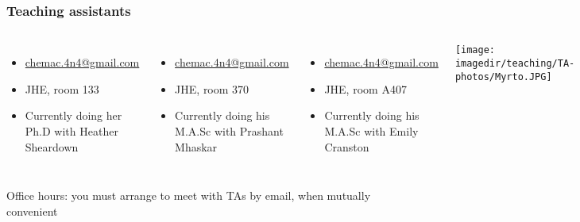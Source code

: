 \begin{frame}\frametitle{Teaching assistants}
	
	\begin{columns}[c]
			{\color{myGreen}{Myrto Korogiannaki}}
			\begin{itemize}
				\item	\url{chemac.4n4@gmail.com}
				\item	JHE, room 133
				\item	Currently doing her Ph.D with Heather Sheardown
			\end{itemize}
			
			\vspace{0.2cm}
			{\color{myGreen}{Tyler Homer}}
			\begin{itemize}
				\item	\url{chemac.4n4@gmail.com}
				\item	JHE, room 370
				\item	Currently doing his M.A.Sc with Prashant Mhaskar
			\end{itemize}
			
			\vspace{0.2cm}
			{\color{myGreen}{Heera Marway}}
			\begin{itemize}
				\item	\url{chemac.4n4@gmail.com}
				\item	JHE, room A407
				\item	Currently doing his M.A.Sc with Emily Cranston
			\end{itemize}
			\centerline{\texttt{[image: \\imagedir/teaching/TA-photos/Myrto.JPG]}}
			\centerline{\texttt{[image: \\imagedir/teaching/TA-photos/homert.JPG]}}
			\centerline{\texttt{[image: \\imagedir/teaching/TA-photos/marway.jpg]}}
			
	\end{columns}
	
	\vspace{0.3cm}
	{\color{myOrange}\scriptsize{Office hours: you must arrange to meet with TAs by email, when mutually convenient}}
\end{frame}

